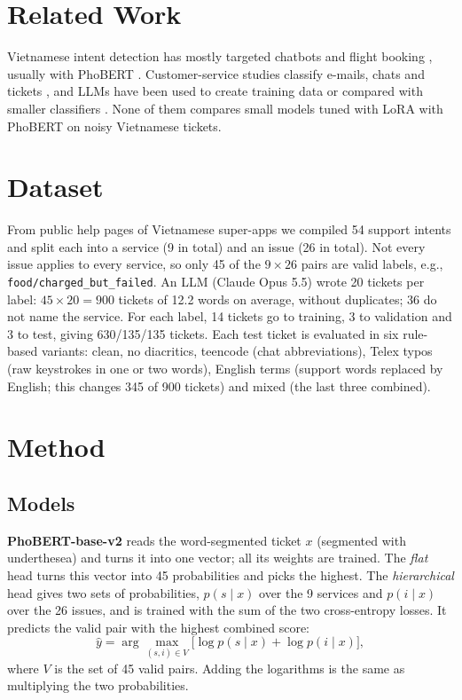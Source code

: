 \documentclass[conference]{IEEEtran}
\begin{document}
\section{Related Work}
\label{sec:related}
Vietnamese intent detection has mostly targeted chatbots and flight
booking \cite{tran2020understanding,nguyen2022intent,nguyen2022advanced},
usually with PhoBERT \cite{nguyen2020phobert}. Customer-service studies
classify e-mails, chats and tickets
\cite{borg2021email,bonechi2024enhancing,pawlik2022method,rizou2023efficient,nowakbrzezinska2025hybrid,rebelo2022automatic,ferrera2025linguistics},
and LLMs have been used to create training data or compared with smaller
classifiers \cite{benayas2024enhancing,madrueno2025novel,alexander2025few,ouaddi2025assessing,pai2026finetuning}.
None of them compares small models tuned with LoRA
\cite{hu2022lora,qwen2024qwen25} with PhoBERT on noisy Vietnamese tickets.

\section{Dataset}
\label{sec:dataset}
From public help pages of Vietnamese super-apps we compiled 54 support
intents and split each into a service (9 in total) and an issue (26 in
total). Not every issue applies to every service, so only 45 of the
$9\times26$ pairs are valid labels, e.g., \texttt{food/charged\_but\_failed}.
An LLM (Claude Opus 5.5) wrote 20 tickets per label:
$45\times20=900$ tickets of 12.2
words on average, without duplicates; 36 do not name the service. For each
label, 14 tickets go to training, 3 to validation and 3 to test, giving
630/135/135 tickets. Each test ticket is evaluated in six rule-based
variants: clean, no diacritics, teencode (chat abbreviations), Telex typos
(raw keystrokes in one or two words), English terms (support words replaced
by English; this changes 345 of 900 tickets) and mixed (the last three
combined).

\section{Method}
\label{sec:method}
\subsection{Models}
\textbf{PhoBERT-base-v2} \cite{nguyen2020phobert} reads the word-segmented
ticket $x$ (segmented with underthesea) and turns it into one vector; all its weights
are trained. The \emph{flat} head turns this vector into 45 probabilities
and picks the highest. The \emph{hierarchical} head gives two sets of
probabilities, $p(s\mid x)$ over the 9 services and $p(i\mid x)$ over the 26
issues, and is trained with the sum of the two cross-entropy losses. It
predicts the valid pair with the highest combined score:
\begin{equation}
\hat{y}=\arg\max_{(s,i)\in V}\big[\log p(s\mid x)+\log p(i\mid x)\big],
\label{eq:hier}
\end{equation}
where $V$ is the set of 45 valid pairs. Adding the logarithms is the same
as multiplying the two probabilities.
\end{document}
